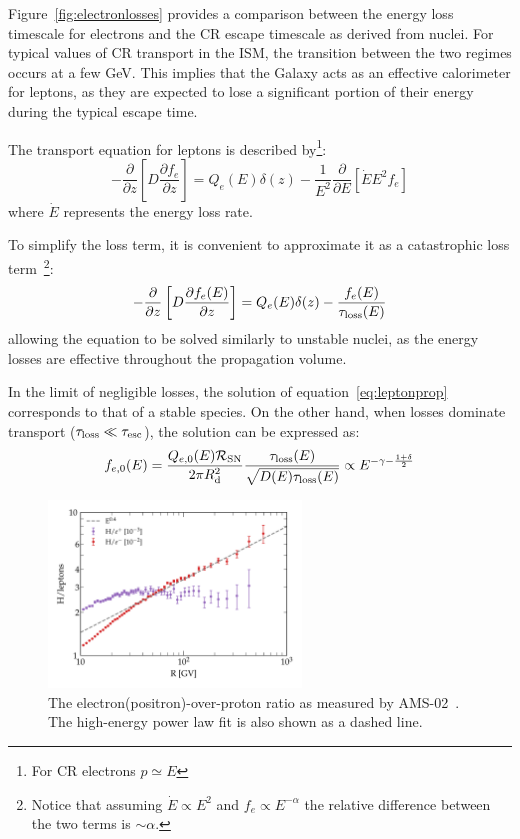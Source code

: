 Figure~\ref{fig:electronlosses} provides a comparison between the energy loss timescale for electrons and the CR escape timescale as derived from nuclei. For typical values of CR transport in the ISM, the transition between the two regimes occurs at a few GeV. This implies that the Galaxy acts as an effective calorimeter for leptons, as they are expected to lose a significant portion of their energy during the typical escape time.

The transport equation for leptons is described by\footnote{For CR electrons $p \simeq E$}:
%
\begin{equation}
-\frac{\partial}{\partial z} \left [D \frac{\partial f_e}{\partial z} \right] 
= Q_e(E) \delta(z)
- \frac{1}{E^2} \frac{\partial}{\partial E} \left[ \dot E E^2 f_e \right] 
\end{equation}
%
where $\dot E$ represents the energy loss rate.

To simplify the loss term, it is convenient to approximate it as a catastrophic loss term~\footnote{Notice that assuming $\dot E \propto E^2$ and $f_e \propto E^{-\alpha}$ the relative difference between the two terms is $\sim\alpha$.}:
%
\begin{equation}
-\frac{\partial}{\partial z} \left [D \frac{\partial f_e(E)}{\partial z} \right] = Q_e(E) \delta(z) - \frac{f_e(E)}{\tau_{\rm loss}(E)}  
\label{eq:leptonprop}
\end{equation}
%
allowing the equation to be solved similarly to unstable nuclei, as the energy losses are effective throughout the propagation volume.

In the limit of negligible losses, the solution of equation~\eqref{eq:leptonprop} corresponds to that of a stable species. On the other hand, when losses dominate transport ($\tau_{\rm loss} \ll \tau_{\rm esc}$), the solution can be expressed as:
%
\begin{equation}f_{e,0}(E) 
= \frac{Q_{e,0}(E) \mathcal R_{\rm SN}}{2 \pi R_{\rm d}^2} \frac{\tau_{\rm loss}(E)}{\sqrt{D(E)\tau_{\rm loss}(E)}}
\propto E^{{-\gamma}-\frac{1 + \delta}{2}}
\label{eq:leptonsolution}
\end{equation}

\begin{figure}[t]
\centering
\includegraphics[width=0.6\textwidth]{figures/H_electron_ratio.pdf}
\caption{The electron(positron)-over-proton ratio as measured by AMS-02~\cite{AMS02.2019.electrons}. The high-energy power law fit is also shown as a dashed line.}
\label{fig:protonelectron}
\end{figure}


